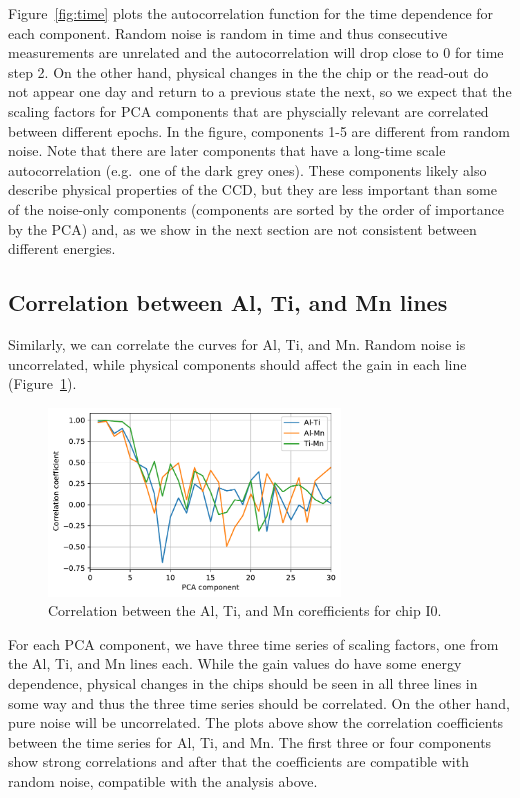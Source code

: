 \documentclass[]{spie}  %
\begin{document}
Figure~\ref{fig:time} plots the autocorrelation function for the time dependence for each component. Random noise is random in time and thus consecutive measurements are unrelated and the autocorrelation will drop close to 0 for time step 2. On the other hand, physical changes in the the chip or the read-out do not appear one day and return to a previous state the next, so we expect that the scaling factors for PCA components that are physcially relevant are correlated between different epochs.
In the figure, components 1-5 are different from random noise. Note that there are later components that have a long-time scale autocorrelation (e.g.\ one of the dark grey ones). These components likely also describe physical properties of the CCD, but they are less important than some of the noise-only components (components are sorted by the order of importance by the PCA) and, as we show in the next section are not consistent between different energies.

\subsection{Correlation between Al, Ti, and Mn lines}

Similarly, we can correlate the curves for Al, Ti, and Mn. Random noise is uncorrelated, while physical components should affect the gain in each line (Figure~\ref{fig:encorr}).

\begin{figure} [ht]
  \begin{center}
    \includegraphics[height=5cm]{figures/encorr.pdf}
  \end{center}
  \caption
      {Correlation between the Al, Ti, and Mn corefficients for chip I0.
        \label{fig:encorr}}
\end{figure}

For each PCA component, we have three time series of scaling factors, one from the Al, Ti, and Mn lines each. While the gain values do have some energy dependence, physical changes in the chips should be seen in all three lines in some way and thus the three time series should be correlated. On the other hand, pure noise will be uncorrelated. The plots above show the correlation coefficients between the time series for Al, Ti, and Mn. The first three or four components show strong correlations and after that the coefficients are compatible with random noise, compatible with the analysis above.
\end{document}
